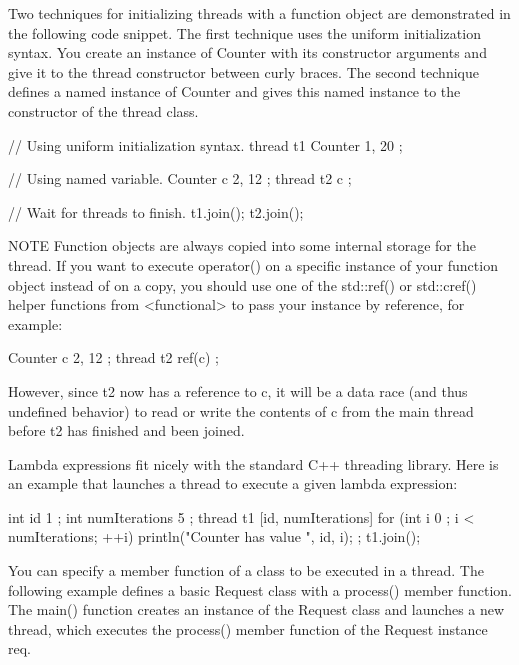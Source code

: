 Two techniques for initializing threads with a function object are demonstrated in the following code snippet. The first technique uses the uniform initialization syntax. You create an instance of Counter with its constructor arguments and give it to the thread constructor between curly braces. The second technique defines a named instance of Counter and gives this named instance to the constructor of the thread class.

\begin{cpp}
// Using uniform initialization syntax.
thread t1 { Counter { 1, 20 } };

// Using named variable.
Counter c { 2, 12 };
thread t2 { c };

// Wait for threads to finish.
t1.join();
t2.join();
\end{cpp}

\begin{myNotic}{NOTE}
Function objects are always copied into some internal storage for the thread. If you want to execute operator() on a specific instance of your function object instead of on a copy, you should use one of the std::ref() or std::cref() helper functions from <functional> to pass your instance by reference, for example:

\begin{cpp}
Counter c { 2, 12 };
thread t2 { ref(c) };
\end{cpp}

However, since t2 now has a reference to c, it will be a data race (and thus undefined behavior) to read or write the contents of c from the main thread before t2 has finished and been joined.
\end{myNotic}


Lambda expressions fit nicely with the standard C++ threading library. Here is an example that launches a thread to execute a given lambda expression:

\begin{cpp}
int id { 1 };
int numIterations { 5 };
thread t1 { [id, numIterations] {
        for (int i { 0 }; i < numIterations; ++i) {
            println("Counter {} has value {}", id, i);
        }
} };
t1.join();
\end{cpp}


You can specify a member function of a class to be executed in a thread. The following example defines a basic Request class with a process() member function. The main() function creates an instance of the Request class and launches a new thread, which executes the process() member function of the Request instance req.

